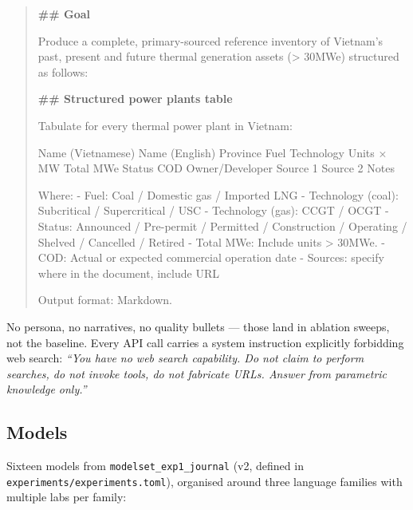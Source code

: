 \documentclass[a4paper,11pt]{article}
\begin{document}
\begin{quote}
\textbf{\#\# Goal}

Produce a complete, primary-sourced reference inventory of Vietnam's
past, present and future thermal generation assets (\textgreater{}
30MWe) structured as follows:

\textbf{\#\# Structured power plants table}

Tabulate for every thermal power plant in Vietnam:

Name (Vietnamese) \textbar{} Name (English) \textbar{} Province
\textbar{} Fuel \textbar{} Technology \textbar{} Units × MW \textbar{}
Total MWe \textbar{} Status \textbar{} COD \textbar{} Owner/Developer
\textbar{} Source 1 \textbar{} Source 2 \textbar{} Notes \textbar{}

Where: - Fuel: Coal / Domestic gas / Imported LNG - Technology (coal):
Subcritical / Supercritical / USC - Technology (gas): CCGT / OCGT -
Status: Announced / Pre-permit / Permitted / Construction / Operating /
Shelved / Cancelled / Retired - Total MWe: Include units \textgreater{}
30MWe. - COD: Actual or expected commercial operation date - Sources:
specify where in the document, include URL

Output format: Markdown.
\end{quote}

No persona, no narratives, no quality bullets --- those land in ablation
sweeps, not the baseline. Every API call carries a system instruction
explicitly forbidding web search: \emph{``You have no web search
capability. Do not claim to perform searches, do not invoke tools, do
not fabricate URLs. Answer from parametric knowledge only.''}

\subsection*{Models}

Sixteen models from \texttt{modelset\_exp1\_journal} (v2, defined in
\texttt{experiments/experiments.toml}), organised around three language
families with multiple labs per family:
\end{document}
